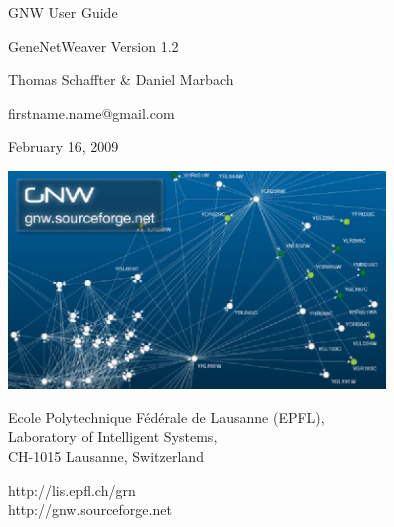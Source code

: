 \documentclass{llncs}
\begin{document}

\begin{center}

\center %
GNW \Huge User Guide

\vspace{0.5cm}

\Large 
GeneNetWeaver Version 1.2

\vspace{0.5cm}

Thomas Schaffter \& Daniel Marbach

firstname.name@gmail.com

\vspace{0.5cm}

February 16, 2009

\vspace{0.5cm}

\includegraphics[width=10cm]{figures/user-guide-title}

\vspace{0.8cm}

Ecole Polytechnique F\'ed\'erale de Lausanne (EPFL),\\
Laboratory of Intelligent Systems,\\
CH-1015 Lausanne, Switzerland

\vspace{0.5cm}

http://lis.epfl.ch/grn\\
http://gnw.sourceforge.net

\end{center}


\pagebreak

\tableofcontents

\pagebreak
\end{document}
